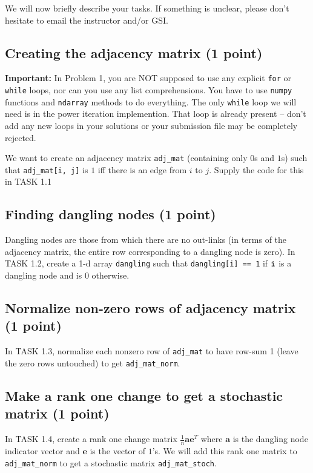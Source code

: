 \documentclass{article}
\begin{document}
We will now briefly describe your tasks. If something is unclear, please don't hesitate to email the instructor and/or GSI.

\subsection{Creating the adjacency matrix (1 point)}

{\bf Important:} In Problem 1, you are NOT supposed to use any explicit \verb#for# or \verb#while# loops, nor can you use any list comprehensions. You have to use \verb#numpy# functions and \verb#ndarray# methods to do everything. The only \verb#while# loop we will need is in the power iteration implemention. That loop is already present -- don't add any new loops in your solutions or your submission file may be completely rejected.

We want to create an adjacency matrix \verb#adj_mat# (containing only $0$s and $1$s) such that \verb#adj_mat[i, j]# is $1$ iff there is an edge from $i$ to $j$. Supply the code for this in TASK 1.1

\subsection{Finding  dangling nodes (1 point)}

Dangling nodes are those from which there are no out-links (in terms of the adjacency matrix, the entire row corresponding to a dangling node is zero). In TASK 1.2, create a 1-d array {\tt dangling} such that {\tt dangling[i] == 1} if ${\tt i}$ is a dangling node and is $0$ otherwise.

\subsection{Normalize non-zero rows of adjacency matrix (1 point)}

In TASK 1.3, normalize each nonzero row of \verb#adj_mat# to have row-sum 1 (leave the zero rows untouched) to get \verb#adj_mat_norm#.

\subsection{Make a rank one change to get a stochastic matrix (1 point)}

In TASK 1.4, create a rank one change matrix $\frac{1}{n} \mathbf{a} \mathbf{e}^T$ where $\mathbf{a}$ is the dangling node indicator vector and $\mathbf{e}$ is the vector of $1$'s.
We will add this rank one matrix to {\tt adj\_mat\_norm} to get a stochastic matrix {\tt adj\_mat\_stoch}.
\end{document}
